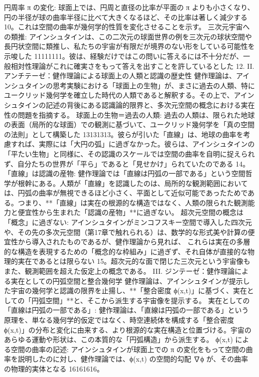 \documentclass{article}
\begin{document}
円周率 π の変化:
球面上では、円周と直径の比率が平面の 
π よりも小さくなり、円の半径が球の曲率半径に比べて大きくなるほど、その比率は著しく減少する 10。これは空間の曲率が幾何学的性質を変化させることを示す。
三次元宇宙への類推:
アインシュタインは、この二次元の球面世界の例を三次元の球状空間や長円状空間に類推し、私たちの宇宙が有限だが境界のない形をしている可能性を示唆した 11111111。彼は、経験だけではこの問いに答えるには不十分だが、一般相対性理論がこれに確実さをもって答えを出すことを許しているとした 12.
II. アンチテーゼ：健作理論による球面上の人類と認識の歴史性
健作理論は、アインシュタインの思考実験における「球面上の生物」が、まさに過去の人類、特にユークリッド幾何学を確立した時代の人類であると解釈する。その上で、アインシュタインの記述の背後にある認識論的限界と、多次元空間の概念における実在性の問題を指摘する。
球面上の生物＝過去の人類:
過去の人類は、限られた地球の表面（局所的な球面）での観測に基づいて、ユークリッド幾何学を「真の空間の法則」として構築した 13131313。彼らが引いた「直線」は、地球の曲率を考慮すれば、実際には「大円の弧」に過ぎなかった。彼らは、アインシュタインの「平たい生物」と同様に、その認識のスケールでは空間の曲率を自明に捉えられず、自分たちの世界が「平ら」であると「見せかけ」られていたのである 14。
「直線」は認識の産物:
健作理論では「直線は円弧の一部である」という空間哲学が根幹にある。人類が「直線」を認識したのは、局所的な観測範囲においては、円弧の曲率が無視できるほど小さく、平面として近似可能であったためである。つまり、**「直線」は実在の根源的な構造ではなく、人類の限られた観測能力と便宜性から生まれた「認識の産物」**に過ぎない。
超次元空間の概念は「概念」に過ぎない:
アインシュタインがミンコフスキー空間で導入した四次元や、その先の多次元空間（第17章で触れられる）は、数学的な形式美や計算の便宜性から導入されたものであるが、健作理論から見れば、
これらは実在の多層的な構造を表現するための「概念的な枠組み」に過ぎず、それ自体が直接的な物理的実在であるとは限らない 15。超次元的な面で閉じた三次元という宇宙像もまた、観測範囲を超えた仮定上の概念である。
III. ジンテーゼ：健作理論による実在としての円弧空間と整合幾何学
健作理論は、アインシュタインが提示した宇宙の幾何学と認識の限界を止揚し、**「整合密度 ϕ(x,t)」に基づく、実在としての「円弧空間」**と、そこから派生する宇宙像を提示する。
実在としての「直線は円弧の一部である」:
健作理論は、「直線は円弧の一部である」という原理を、単なる幾何学的仮定ではなく、時空連続体を構成する「整合密度 ϕ(x,t)」の分布と変化に由来する、より根源的な実在構造と位置づける。宇宙のあらゆる運動や形状は、この本質的な「円弧構造」から派生する。
ϕ(x,t) による空間の曲率の記述:
アインシュタインが球面上での 
π の変化をもって空間の曲率を説明したのに対し、健作理論では、ϕ(x,t) の空間的勾配 ∇ϕ が、その曲率の物理的実体となる 16161616。
\end{document}
